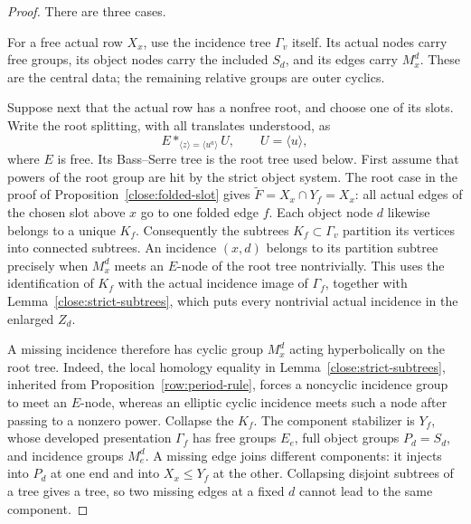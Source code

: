 \begin{proof}
There are three cases.

For a free actual row $X_x$, use the incidence tree $\Gamma_v$ itself.
Its actual nodes carry free groups, its object nodes carry the included
$S_d$, and its edges carry $M_x^d$.  These are the central data; the
remaining relative groups are outer cyclics.

Suppose next that the actual row has a nonfree root, and choose one of
its slots.  Write the root splitting, with all translates understood, as
\[
 E*_{\langle z\rangle=\langle u^a\rangle} U,
 \qquad U=\langle u\rangle,
\]
where $E$ is free. Its Bass--Serre tree is the root tree used below.
First assume that powers of the root group are hit by the strict object
system. The root case in the proof of
Proposition~\ref{close:folded-slot} gives
$\widetilde F=X_x\cap Y_f=X_x$: all actual edges of the chosen slot above $x$ go to
one folded edge $f$.  Each object node $d$ likewise belongs to a unique
$K_f$.  Consequently the subtrees $K_f\subset\Gamma_v$ partition its
vertices into connected subtrees.  An incidence $(x,d)$ belongs to its
partition subtree precisely when $M_x^d$ meets an $E$-node of the root
tree nontrivially.  This uses the identification of $K_f$ with the actual
incidence image of $\Gamma_f$, together with
Lemma~\ref{close:strict-subtrees}, which puts every nontrivial actual
incidence in the enlarged $Z_d$.

A missing incidence therefore has cyclic group $M_x^d$ acting
hyperbolically on the root tree. Indeed, the local homology equality in
Lemma~\ref{close:strict-subtrees}, inherited from
Proposition~\ref{row:period-rule}, forces
a noncyclic incidence group to meet an $E$-node, whereas an elliptic
cyclic incidence meets such a node after passing to a nonzero power.
Collapse the $K_f$.  The component stabilizer is $Y_f$, whose developed
presentation $\Gamma_f$ has free groups $E_e$, full object groups
$P_d=S_d$, and incidence groups $M_e^d$.  A missing edge joins different
components: it injects into $P_d$ at one end and into
$X_x\le Y_f$ at the other.  Collapsing disjoint subtrees of a tree gives
a tree, so two missing edges at a fixed $d$ cannot lead to the same
component.


\end{proof}
